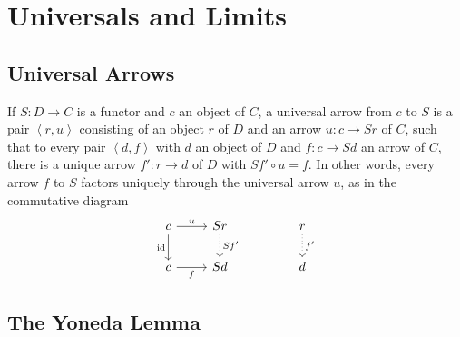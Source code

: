 \section{Universals and Limits} %
\label{sec:universals_and_limits}
\subsection{Universal Arrows} %
\label{sub:universal_arrows}
\begin{definition}
   If $ S: D \to C $ is a functor and $ c $ an object of $ C $, a universal arrow from $ c $ to $ S $ is a pair $ \left\langle r, u \right\rangle $ consisting of an object $ r $ of $ D $ and an arrow $ u: c \to Sr $ of $ C $, such that to every pair $ \left\langle d,f \right\rangle  $ with $ d $ an object of $ D $ and $ f: c \to Sd $ an arrow of $ C $, there is a unique arrow $ f': r\to d $ of $ D $ with $ Sf'\circ u = f $. In other words, every arrow $ f $ to $ S $ factors uniquely through the universal arrow $ u $, as in the commutative diagram
   \[\begin{tikzcd}
	   c & Sr && r \\
	   c & Sd && d
	   \arrow["u", from=1-1, to=1-2]
	   \arrow["{Sf'}", dotted, from=1-2, to=2-2]
	   \arrow["f"', from=2-1, to=2-2]
	   \arrow["{\text{id}}"', from=1-1, to=2-1]
	   \arrow["{f'}", dotted, from=1-4, to=2-4]
   \end{tikzcd}\]
\end{definition}

\subsection{The Yoneda Lemma} %
\label{sub:the_yoneda_lemma}
\begin{proposition}
\end{proposition}

